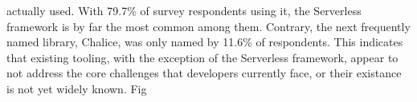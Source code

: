 actually used. With 79.7\% of survey respondents using it, the Serverless framework is by far the most common among them. Contrary, the next frequently named library, Chalice, was only named by 11.6\% of respondents. This indicates that existing tooling, with the exception of the Serverless framework, appear to not address the core challenges that developers currently face, or their existance is not yet widely known. Fig \cite{leitner2019mixed}









